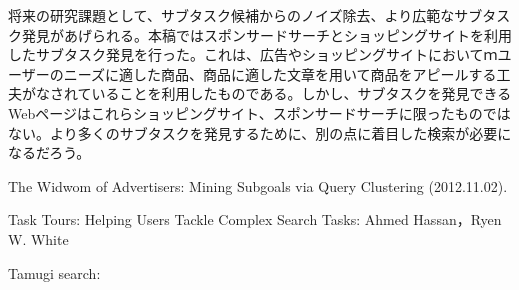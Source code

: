 \documentclass[submit,techreq]{ipsj}
\begin{document}
将来の研究課題として、サブタスク候補からのノイズ除去、より広範なサブタスク発見があげられる。本稿ではスポンサードサーチとショッピングサイトを利用したサブタスク発見を行った。これは、広告やショッピングサイトにおいてｍユーザーのニーズに適した商品、商品に適した文章を用いて商品をアピールする工夫がなされていることを利用したものである。しかし、サブタスクを発見できるWebページはこれらショッピングサイト、スポンサードサーチに限ったものではない。より多くのサブタスクを発見するために、別の点に着目した検索が必要になるだろう。


\begin{thebibliography}{10}


The Widwom of Advertisers: Mining Subgoals via Query Clustering
(2012.11.02).

Task Tours: Helping Users Tackle Complex Search Tasks:
Ahmed Hassan，Ryen W. White

Tamugi search:




\end{thebibliography}



\begin{biography}
%
\end{biography}
\end{document}

